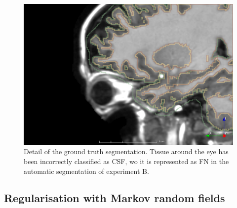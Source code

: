 \begin{figure}
  \centering
  \includegraphics[width=\textwidth]{figures/priors_manual_wrong}
  \caption{Detail of the ground truth segmentation. Tissue around the eye has been incorrectly classified as CSF, wo it is represented as FN in the automatic segmentation of experiment B.}
  \label{fig:manual-wrong}
\end{figure}


%
%



\subsection{Regularisation with Markov random fields}


